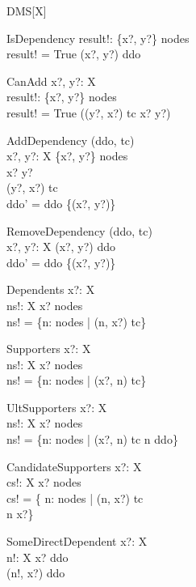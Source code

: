 \begin{class}{DMS}[X]
\begin{schema}{IsDependency}
  result!:  \bool  
\where
  \{x?, y?\} \subseteq nodes \\ 
  result! = True \iff (x?, y?) \in ddo 
\end{schema}
\begin{schema}{CanAdd}
  x?, y?:  X  \\
  result!:  \bool  
\where
  \{x?, y?\} \subseteq nodes \\ 
  result! = True \iff ((y?, x?) \notin tc \land x? \neq y?)
\end{schema}
\begin{schema}{AddDependency}
  \Delta (ddo, tc)\\
  x?, y?:  X  
\where
  \{x?, y?\} \subseteq nodes \\
  x? \neq y? \\
  (y?, x?) \notin tc \\ 
  ddo' = ddo \cup \{(x?, y?)\}
\end{schema}
\begin{schema}{RemoveDependency}
  \Delta (ddo, tc)\\
  x?, y?:  X  
\where
  (x?, y?) \in ddo \\ 
  ddo' = ddo \setminus \{(x?, y?)\}
\end{schema}
\begin{schema}{Dependents}
  x?:  X  \\
  ns!:  \finset  X  
\where
  x? \in nodes \\ 
  ns! = \{n: nodes | (n, x?) \in tc\}
\end{schema}
\begin{schema}{Supporters}
  x?:  X  \\
  ns!: \finset  X  
\where
  x? \in nodes \\ 
  ns! = \{n: nodes | (x?, n) \in tc\}
\end{schema}
\begin{schema}{UltSupporters}
  x?:  X  \\
  ns!: \finset  X  
\where
  x? \in nodes \\ 
  ns! = \{n: nodes | (x?, n) \in tc \land n \notin  \dom ddo\}
\end{schema}
\begin{schema}{CandidateSupporters}
  x?:  X  \\
  cs!:  \finset  X 
\where
  x? \in nodes \\ 
  cs! = \{ n: nodes | (n, x?) \notin tc \land \\ n \neq x?\}
\end{schema}
\begin{schema}{SomeDirectDependent}
  x?:  X  \\
  n!:  X  
\where
  x? \in  \ran ddo \\ 
  (n!, x?) \in ddo
\end{schema} 
\end{class} 

